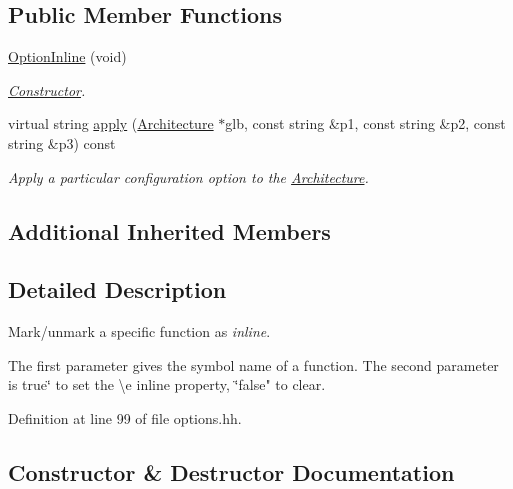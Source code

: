 \subsection*{Public Member Functions}
\begin{DoxyCompactItemize}
\item 
\mbox{\hyperlink{class_option_inline_a116f209e705181a57cd2d0df7d94d4cf}{Option\+Inline}} (void)
\begin{DoxyCompactList}\small\item\em \mbox{\hyperlink{class_constructor}{Constructor}}. \end{DoxyCompactList}\item 
virtual string \mbox{\hyperlink{class_option_inline_aec2b4cc28f9de203dbc2ff8901c93dc8}{apply}} (\mbox{\hyperlink{class_architecture}{Architecture}} $\ast$glb, const string \&p1, const string \&p2, const string \&p3) const
\begin{DoxyCompactList}\small\item\em Apply a particular configuration option to the \mbox{\hyperlink{class_architecture}{Architecture}}. \end{DoxyCompactList}\end{DoxyCompactItemize}
\subsection*{Additional Inherited Members}


\subsection{Detailed Description}
Mark/unmark a specific function as {\itshape inline}. 

The first parameter gives the symbol name of a function. The second parameter is true\char`\"{} to set the \textbackslash{}e inline property, \char`\"{}false" to clear. 

Definition at line 99 of file options.\+hh.



\subsection{Constructor \& Destructor Documentation}
\mbox{\label{class_option_inline_a116f209e705181a57cd2d0df7d94d4cf}} 
